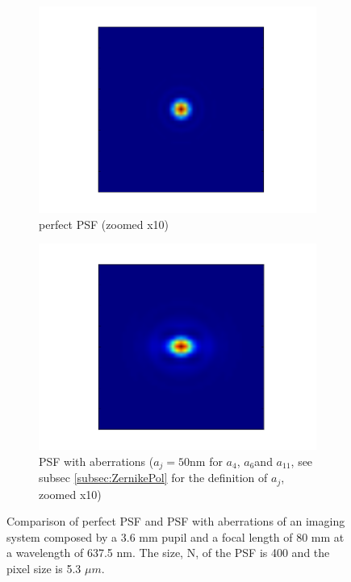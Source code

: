 \begin{figure}
 \centering
     \begin{subfigure}{0.45\textwidth}
         \includegraphics[width=\textwidth]{Figures/PSFzoom}
         \caption{perfect PSF (zoomed x10)}
         \label{subfig:perfPSF}
     \end{subfigure}
     \quad
     \begin{subfigure}{0.45\textwidth}
         \includegraphics[width=\textwidth]{Figures/PSFzoomWthAb}
         \caption{PSF with aberrations ($a_j = 50 \mathrm{nm}$ for $a_{4}$, $a_{6}$and $a_{11}$, see subsec \ref{subsec:ZernikePol} for the definition of $a_j$, zoomed x10)}
         \label{subfig:PSFWthAb}
     \end{subfigure}
     \decoRule
     \caption{Comparison of perfect PSF and PSF with aberrations of an imaging system composed by a 3.6 mm pupil and a focal length of 80 mm at a wavelength of 637.5 nm. The size, N, of the PSF is 400 and the pixel size is 5.3 $\mu m$.}
     \label{fig:ComparisonPSFs}
 \end{figure} 

